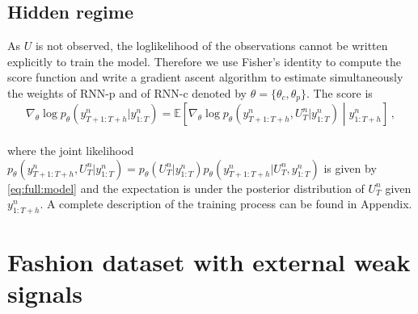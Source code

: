 \documentclass{article} %
\newcommand{\ts}{y}
\newcommand{\rnnparam}{\theta}
\newcommand{\hiddenregime}{U}
\begin{document}
\subsection{Hidden regime}

As $\hiddenregime$ is not observed, the loglikelihood of the observations cannot be written explicitly to train the model. Therefore we use Fisher's identity to compute the score function and write a gradient ascent algorithm to estimate simultaneously the weights of RNN-p and of RNN-c denoted by $\rnnparam = \{\rnnparam_c,\rnnparam_p\}$. The score is
\begin{equation}
\nabla_\theta \log p_\theta(\ts^n_{T+1:T+h}|\ts^n_{1:T}) = \mathbb{E}\left[\nabla_\theta \log p_\theta(\ts^n_{T+1:T+h},U_T^n|\ts^n_{1:T})\middle|\ts^n_{1:T+h}\right]\,,
\end{equation}
\\
where the joint likelihood $p_\theta(\ts^n_{T+1:T+h},U_T^n|\ts^n_{1:T}) = p_\theta(U_T^n|\ts^n_{1:T})p_\theta(\ts^n_{T+1:T+h}|U_T^n,\ts^n_{1:T})$ is given by \eqref{eq:full:model} and the expectation is under the posterior distribution of $U_T^n$ given $\ts^n_{1:T+h}$.
A complete description of the training process can be found in Appendix.



\section{Fashion dataset with external weak signals}
\label{sec:dataset}
\end{document}
